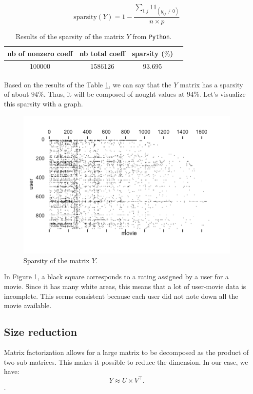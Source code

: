 \documentclass{article}
\begin{document}
\[ \text{sparsity}(Y)= 1 - \dfrac{\sum_{i,j} 1\!\!1_{(y_{ij} \neq 0)}}{n\times p}\]

\begin{table}[H]
    \centering
    \begin{tabular}{|c|c|c|c|}
    \hline
      nb of nonzero coeff &  nb total coeff & sparsity ($\%$) \\\hline
        100000 & 1586126 & 93.695 \\\hline
    \end{tabular}
    \caption{Results of the sparsity of the matrix $Y$ from \texttt{Python}.}
    \label{tab:sparsity}
\end{table}

Based on the results of the Table \ref{tab:sparsity}, we can say that the $Y$ matrix has a sparsity of about $94\%$. Thus, it will be composed of nought values at $94\%$. Let’s visualize this sparsity with a graph.
\begin{figure}[H]
\centering
  \includegraphics[scale=0.68]{./images/sparse.pdf}
  \caption{Sparsity of the matrix $Y$.}
  \label{fig:sparse_fig}
\end{figure}

In Figure \ref{fig:sparse_fig}, a black square corresponds to a rating assigned by a user for a movie. Since it has many white areas, this means that a lot of user-movie data is incomplete. This seems consistent because each user did not note down all the movie available.

\subsection{Size reduction}
Matrix factorization allows for a large matrix to be decomposed as the product of two sub-matrices. This makes it possible to reduce the dimension. In our case, we have:
$$Y \approx U\times V^{\top}.$$.
\end{document}
